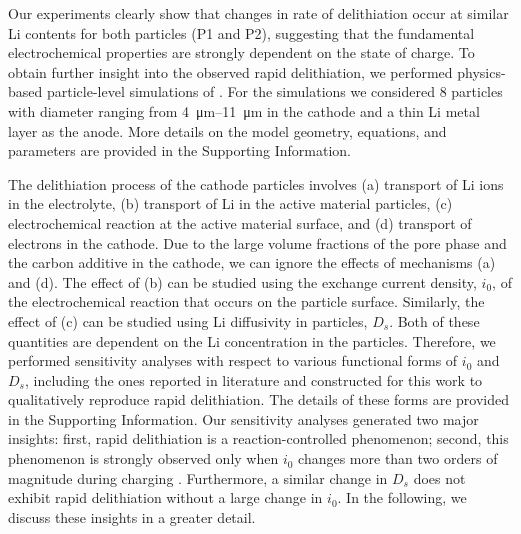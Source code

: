 \documentclass{article}
\begin{document}

Our experiments clearly show that changes in rate of delithiation occur at similar Li contents for both particles (P1 and P2), suggesting that the fundamental electrochemical properties are strongly dependent on the state of charge. To obtain further insight into the observed rapid delithiation, we performed physics-based particle-level simulations of \nca{}. For the simulations we considered 8 particles with diameter ranging from \SIrange{4}{11}{\micro\meter} in the cathode and a thin Li metal layer as the anode. More details on the model geometry, equations, and parameters are provided in the Supporting Information.  

The delithiation process of the cathode particles involves (a) transport of Li ions in the electrolyte, (b) transport of Li in the active material particles, (c) electrochemical reaction at the active material surface, and (d) transport of electrons in the cathode. Due to the large volume fractions of the pore phase and the carbon additive in the cathode, we can ignore the effects of mechanisms (a) and (d). The effect of (b) can be studied using the exchange current density, $i_0$, of the electrochemical reaction that occurs on the particle surface. Similarly, the effect of (c) can be studied using Li diffusivity in particles, $D_s$. Both of these quantities are dependent on the Li concentration in the particles. Therefore, we performed sensitivity analyses with respect to various functional forms of $i_0$ and $D_s$, including the ones reported in literature and constructed for this work to qualitatively reproduce rapid delithiation. The details of these forms are provided in the Supporting Information. Our sensitivity analyses generated two major insights: first, rapid delithiation is a reaction-controlled phenomenon; second, this phenomenon is strongly observed only when $i_0$ changes more than two orders of magnitude during charging . Furthermore, a similar change in $D_s$ does not exhibit rapid delithiation without a large change in $i_0$. In the following, we discuss these insights in a greater detail.
\end{document}

